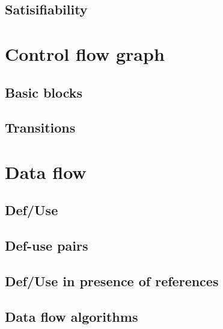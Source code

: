 \documentclass{article}
\begin{document}
\subsection{Satisifiability} 

\section{Control flow graph} 
\subsection{Basic blocks} 
\subsection{Transitions} 
 
\section{Data flow} 
\subsection{Def/Use} 
\subsection{Def-use pairs} 
\subsection{Def/Use in presence of references} 
\subsection{Data flow algorithms}
\end{document}
